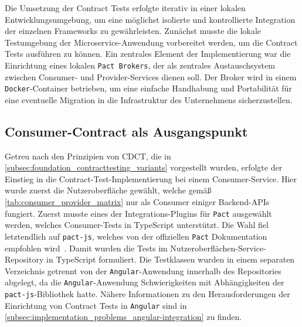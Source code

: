 Die Umsetzung der Contract Tests erfolgte iterativ in einer lokalen Entwicklungsumgebung, um eine möglichst isolierte und kontrollierte Integration der einzelnen Frameworks zu gewährleisten.
Zunächst musste die lokale Testumgebung der Microservice-Anwendung vorbereitet werden, um die Contract Tests ausführen zu können.
Ein zentrales Element der Implementierung war die Einrichtung eines lokalen \texttt{Pact Brokers}, der als zentrales Austauschsystem zwischen Consumer- und Provider-Services dienen soll.
Der Broker wird in einem \texttt{\gls{Docker}}-Container betrieben, um eine einfache Handhabung und Portabilität für eine eventuelle Migration in die Infrastruktur des Unternehmens sicherzustellen.

\subsection{Consumer-Contract als Ausgangspunkt}\label{subsec:implementation_execution_consumer-contract}

Getreu nach den Prinzipien von \gls{CDCT}, die in \cref{subsec:foundation_contracttesting_variants} vorgestellt wurden, erfolgte der Einstieg in die Contract-Test-Implementierung bei einem Consumer-Service.
Hier wurde zuerst die Nutzeroberfläche gewählt, welche gemäß \cref{tab:consumer_provider_matrix} nur als Consumer einiger Backend-\glspl{API} fungiert.
Zuerst musste eines der Integrations-Plugins für \texttt{Pact} ausgewählt werden, welches Consumer-Tests in TypeScript unterstützt.
Die Wahl fiel letztendlich auf \texttt{pact-js}, welches von der offiziellen \texttt{Pact} Dokumentation empfohlen wird~\cite{pactfoundationPactDocs2022}.
Damit wurden die Tests im Nutzeroberflächen-Service-Repository in TypeScript formuliert.
Die Testklassen wurden in einem separaten Verzeichnis getrennt von der \texttt{\gls{Angular}}-Anwendung innerhalb des Repositories abgelegt, da die \texttt{\gls{Angular}}-Anwendung Schwierigkeiten mit Abhängigkeiten der \texttt{pact-js}-Bibliothek hatte.
Nähere Informationen zu den Herausforderungen der Einrichtung von Contract Tests in \texttt{\gls{Angular}} sind in \cref{subsec:implementation_problems_angular-integration} zu finden.

